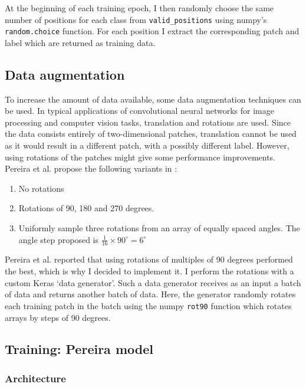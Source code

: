 \documentclass[12pt,a4paper,twoside,openright]{report}
\begin{document}
At the beginning of each training epoch, I then randomly choose the same number of positions for each class from \texttt{valid\_positions} using numpy's \texttt{random.choice} function. For each position I extract the corresponding patch and label which are returned as training data.

\subsection{Data augmentation}
To increase the amount of data available, some data augmentation techniques can be used. In typical applications of convolutional neural networks for image processing and computer vision tasks, translation and rotations are used. Since the data consists entirely of two-dimensional patches, translation cannot be used as it would result in a different patch, with a possibly different label. However, using rotations of the patches might give some performance improvements. Pereira et al. propose the following variants in \cite{pereira}:
\begin{enumerate}
	\item No rotations
	\item Rotations of 90, 180 and 270 degrees.
	\item Uniformly sample three rotations from an array of equally spaced angles. The angle step proposed is $\frac{1}{16} \times 90^{\circ} = 6^{\circ}$
\end{enumerate}
Pereira et al. reported that using rotations of multiples of 90 degrees performed the best, which is why I decided to implement it. I perform the rotations with a custom Keras `data generator'. Such a data generator receives as an input a batch of data and returns another batch of data. Here, the generator randomly rotates each training patch in the batch using the numpy \texttt{rot90} function which rotates arrays by steps of 90 degrees.

\subsection{Training: Pereira model}

\subsubsection{Architecture}
\end{document}
